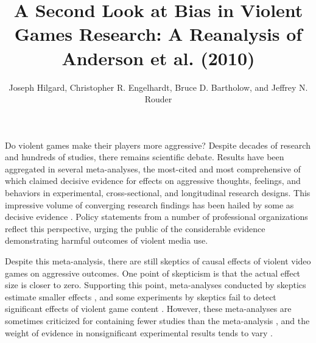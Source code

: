\documentclass[man]{apa6}
\author{Joseph Hilgard, Christopher R. Engelhardt, Bruce D. Bartholow, and Jeffrey N. Rouder}
\title{A Second Look at Bias in Violent Games Research: A Reanalysis of Anderson et al. (2010)}
\affiliation{University of Missouri}
\begin{document}
\maketitle

Do violent games make their players more aggressive? Despite decades of research and hundreds of studies, there remains scientific debate. Results have been aggregated in several meta-analyses, the most-cited and most comprehensive of which \citep{Anderson:etal:2010} claimed decisive evidence for effects on aggressive thoughts, feelings, and behaviors in experimental, cross-sectional, and longitudinal research designs. 
This impressive volume of converging research findings has been hailed by some as decisive evidence \citep{Bushman:etal:2010,Huesmann:2010,Huesmann:2014}. 
Policy statements from a number of professional organizations \citep[e.g.,][]{AAP:2009} reflect this perspective, urging the public of the considerable evidence demonstrating harmful outcomes of violent media use.


Despite this meta-analysis, there are still skeptics of causal effects of violent video games on aggressive outcomes.
One point of skepticism is that the actual effect size is closer to zero. Supporting this point, meta-analyses conducted by skeptics estimate smaller effects \citep{Ferguson:2007a,Ferguson:2007b,Ferguson:InPress,Sherry:2001}, %
and some experiments by skeptics fail to detect significant effects of violent game content \citep{Adachi:Willoughby:2011,Elson:etal:2013,Ferguson:etal:2008,Valadez:Ferguson:2012}. However, these meta-analyses are sometimes criticized for containing fewer studies than the \citet{Anderson:etal:2010} meta-analysis \citep[][see, e.g., a response by ]{Bushman:XXXX}, and the weight of evidence in nonsignificant experimental results tends to vary \citep{Hilgard:etal:2015}.
\end{document}
